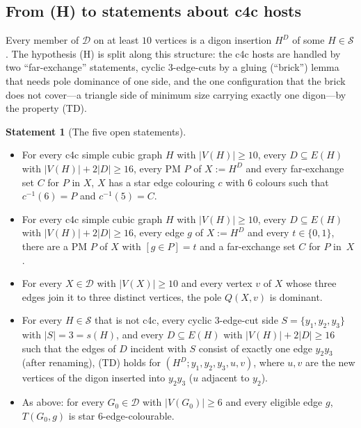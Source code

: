 \documentclass[11pt]{amsart}
\theoremstyle{definition}
\newtheorem{hypothesis}[theorem]{Statement}
\theoremstyle{remark}
\newcommand{\cD}{\mathcal{D}}
\newcommand{\cS}{\mathcal{S}}
\newcommand{\hyp}[1]{\textup{(#1)}}
\begin{document}
\subsection{From \hyp{H} to statements about c4c hosts}
Every member of $\cD$ on at least $10$ vertices is a digon insertion $H^D$ of some $H\in\cS$.
The hypothesis \hyp{H} is split along this structure: the c4c hosts are handled by two ``far-exchange'' statements, cyclic $3$-edge-cuts by a gluing (``brick'') lemma that needs pole dominance of one side, and the one configuration that the brick does not cover---a triangle side of minimum size carrying exactly one digon---by the property \hyp{TD}.

\begin{hypothesis}[The five open statements]\label{stmt:five}
\leavevmode
\begin{itemize}
\item[\hyp{FE-EXT-D}$_{10}$] For every c4c simple cubic graph $H$ with $|V(H)|\ge 10$, every $D\subseteq E(H)$ with $|V(H)|+2|D|\ge 16$, every PM $P$ of $X:=H^D$ and every far-exchange set $C$ for $P$ in $X$, $X$ has a star edge colouring $c$ with $6$ colours such that $c^{-1}(6)=P$ and $c^{-1}(5)=C$.
\item[\hyp{FE-EXIST-D}$_{10}$] For every c4c simple cubic graph $H$ with $|V(H)|\ge 10$, every $D\subseteq E(H)$ with $|V(H)|+2|D|\ge 16$, every edge $g$ of $X:=H^D$ and every $t\in\{0,1\}$, there are a PM $P$ of $X$ with $[g\in P]=t$ and a far-exchange set $C$ for $P$ in~$X$.
\item[\hyp{POLE}] For every $X\in\cD$ with $|V(X)|\ge 10$ and every vertex $v$ of $X$ whose three edges join it to three distinct vertices, the pole $Q(X,v)$ is dominant.
\item[\hyp{TD-TRI}] For every $H\in\cS$ that is not c4c, every cyclic $3$-edge-cut side $S=\{y_1,y_2,y_3\}$ with $|S|=3=s(H)$, and every $D\subseteq E(H)$ with $|V(H)|+2|D|\ge 16$ such that the edges of $D$ incident with $S$ consist of exactly one edge $y_2y_3$ (after renaming), \hyp{TD} holds for $(H^D;y_1,y_2,y_3,u,v)$, where $u,v$ are the new vertices of the digon inserted into $y_2y_3$ ($u$ adjacent to $y_2$).
\item[\hyp{II$_D$}] As above: for every $G_0\in\cD$ with $|V(G_0)|\ge 6$ and every eligible edge $g$, $T(G_0,g)$ is star $6$-edge-colourable.
\end{itemize}
\end{hypothesis}
\end{document}
